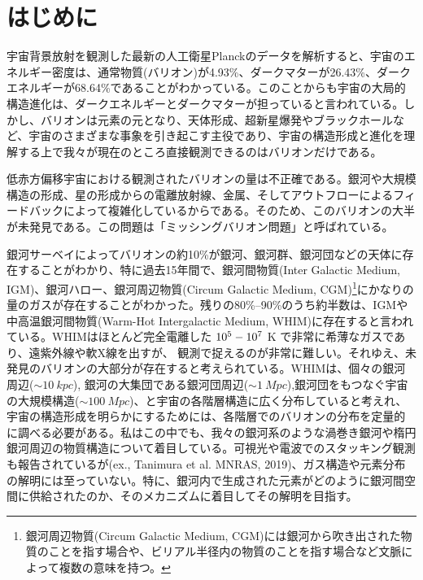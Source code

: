 \chapter{はじめに}

宇宙背景放射を観測した最新の人工衛星Planckのデータを解析すると、宇宙のエネルギー密度は、通常物質(バリオン)が4.93\%、ダークマターが26.43\%、ダークエネルギーが68.64\%であることがわかっている\citep{aghanim_planck_2020}。このことからも宇宙の大局的構造進化は、ダークエネルギーとダークマターが担っていると言われている。しかし、バリオンは元素の元となり、天体形成、超新星爆発やブラックホールなど、宇宙のさまざまな事象を引き起こす主役であり、宇宙の構造形成と進化を理解する上で我々が現在のところ直接観測できるのはバリオンだけである。

低赤方偏移宇宙における観測されたバリオンの量は不正確である。銀河や大規模構造の形成、星の形成からの電離放射線、金属、そしてアウトフローによるフィードバックによって複雑化しているからである\citep{shull_baryon_2012}。そのため、このバリオンの大半が未発見である。この問題は「ミッシングバリオン問題」と呼ばれている。%

銀河サーベイによってバリオンの約10\%が銀河、銀河群、銀河団などの天体に存在することがわかり、特に過去15年間で、銀河間物質(Inter Galactic Medium, IGM)、銀河ハロー、銀河周辺物質(Circum Galactic Medium, CGM)\footnote{銀河周辺物質(Circum Galactic Medium, CGM)には銀河から吹き出された物質のことを指す場合や、ビリアル半径内の物質のことを指す場合など文脈によって複数の意味を持つ。}にかなりの量のガスが存在することがわかった。残りの80\%--90\%のうち約半数は、IGMや中高温銀河間物質(Warm-Hot Intergalactic Medium, WHIM)に存在すると言われている\citep{shull_baryon_2012,danforth_low-z_2008}。WHIMはほとんど完全電離した $10^5\--10^7$ K で非常に希薄なガスであり、遠紫外線や軟X線を出すが、
観測で捉えるのが非常に難しい。それゆえ、未発見のバリオンの大部分が存在すると考えられている。WHIMは、個々の銀河周辺($\sim\SI{10}{kpc}$), 銀河の大集団である銀河団周辺($\sim\SI{1}{Mpc}$),銀河団をもつなぐ宇宙の大規模構造($\sim\SI{100}{Mpc}$)、と宇宙の各階層構造に広く分布していると考えれ、宇宙の構造形成を明らかにするためには、各階層でのバリオンの分布を定量的に調べる必要がある。私はこの中でも、我々の銀河系のような渦巻き銀河や楕円銀河周辺の物質構造について着目している。可視光や電波でのスタッキング観測も報告されているが(ex., Tanimura et al. MNRAS, 2019)、ガス構造や元素分布の解明には至っていない。特に、銀河内で生成された元素がどのように銀河間空間に供給されたのか、そのメカニズムに着目してその解明を目指す。

